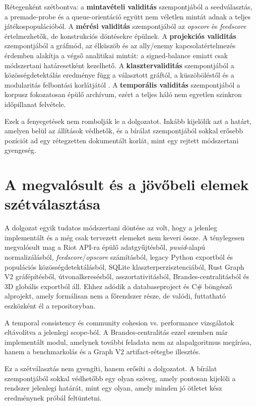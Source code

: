 Rétegenként szétbontva: a \textbf{mintavételi validitás} szempontjából a seedválasztás, a premade-probe és a queue-orientáció együtt nem véletlen mintát adnak a teljes játékospopulációból. A \textbf{mérési validitás} szempontjából az \textit{opscore} és \textit{feedscore} értelmezhetők, de konstrukciós döntésekre épülnek. A \textbf{projekciós validitás} szempontjából a gráfmód, az élküszöb és az ally/enemy kapcsolatértelmezés érdemben alakítja a végső analitikai mintát: a signed-balance emiatt csak módszertani határesetként kezelhető. A \textbf{klasztervaliditás} szempontjából a közösségdetektálás eredménye függ a választott gráftól, a küszöböléstől és a modularitás felbontási korlátjától \cite{fortunato_barthelemy2007}. A \textbf{temporális validitás} szempontjából a korpusz fokozatosan épülő archívum, ezért a teljes háló nem egyetlen szinkron időpillanat felvétele.

Ezek a fenyegetések nem rombolják le a dolgozatot. Inkább kijelölik azt a határt, amelyen belül az állítások védhetők, és a bírálat szempontjából sokkal erősebb pozíciót ad egy rétegzetten dokumentált korlát, mint egy rejtett módszertani gyengeség.

\section{A megvalósult és a jövőbeli elemek szétválasztása}

A dolgozat egyik tudatos módszertani döntése az volt, hogy a jelenleg implementált és a még csak tervezett elemeket nem keveri össze. A ténylegesen megvalósult mag a Riot API-ra épülő adatgyűjtésből, \textit{puuid}-alapú normalizálásból, \textit{feedscore}/\textit{opscore} számításból, legacy Python exportból és populációs közösségdetektálásból, SQLite klaszterperzisztenciából, Rust Graph V2 gráfépítésből, útvonalkeresésből, asszortativitásból, Brandes-centralitásból és 3D globális exportból áll. Ehhez adódik a databaseproject és C\# böngésző alprojekt, amely formálisan nem a főrendszer része, de valódi, futtatható eszközként él a repositoryban.

A temporal consistency és community cohesion vs. performance vizsgálatok eltávolítva a jelenlegi scope-ból. A Brandes-centralitás ezzel szemben már implementált modul, amelynek további feladata nem az alapalgoritmus megírása, hanem a benchmarkolás és a Graph V2 artifact-rétegbe illesztés.

Ez a szétválasztás nem gyengíti, hanem erősíti a dolgozatot. A bírálat szempontjából sokkal védhetőbb egy olyan szöveg, amely pontosan kijelöli a rendszer jelenlegi határát, mint egy olyan, amely minden jó ötletet kész eredménynek próbál feltüntetni.
